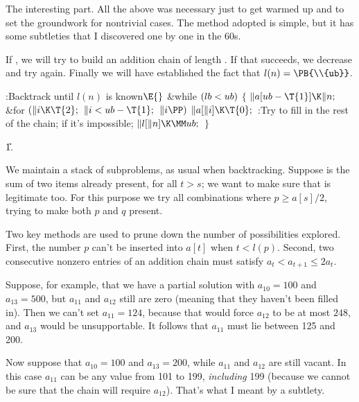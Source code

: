 The interesting part. All the above was necessary just
to get
warmed up and to set the groundwork for nontrivial cases.
The method adopted is simple, but it has some subtleties that
I discovered one by one in the 60s.

If , we will try to build an addition chain of length .
If that succeeds, we decrease  and try again. Finally we will
have established the fact that $l(n)=\PB{\\{ub}}$.

\Y\B\4:Backtrack until $l(n)$ is known\X${}\E{}$\6
\&{while} ${}(\\{lb}<\\{ub}){}$\5
${}\{{}$\1\6
${}\|a[\\{ub}-\T{1}]\K\|n;{}$\6
\&{for} ${}(\|i\K\T{2};{}$ ${}\|i<\\{ub}-\T{1};{}$ ${}\|i\PP){}$\1\5
${}\|a[\|i]\K\T{0};{}$\2\6
:Try to fill in the rest of the chain;  if it's
impossible\X;\6
${}\|l[\|n]\K\MM\\{ub};{}$\6
\4${}\}{}$\2\par
\U1.\fi

We maintain a stack of subproblems, as usual when
backtracking.
Suppose  is the sum of two items already present, for all
$t>s$; we want to make sure that  is legitimate too.
For this purpose we try all combinations  where
$p\ge a[s]/2$, trying to make both $p$ and $q$ present.

Two key methods are used to prune down the number of possibilities
explored. First, the number $p$ can't be inserted into $a[t]$ when $t<l(p)$.
Second, two consecutive nonzero entries of an addition chain must
satisfy $a_t<a_{t+1}\le 2a_t$.

Suppose, for example, that we have a partial solution with $a_{10}=100$
and $a_{13}=500$, but $a_{11}$ and $a_{12}$ still are zero (meaning that
they haven't been filled in). Then we can't set $a_{11}=124$, because
that would force $a_{12}$ to be at most $248$, and $a_{13}$ would be
unsupportable. It follows that $a_{11}$ must lie between 125 and 200.

Now suppose that $a_{10}=100$ and $a_{13}=200$, while $a_{11}$ and
$a_{12}$ are still vacant. In this case $a_{11}$ can be any value
from 101 to 199, {\it including\/} 199 (because we cannot be
sure that the chain will require $a_{12}$). That's what I meant
by a subtlety.

